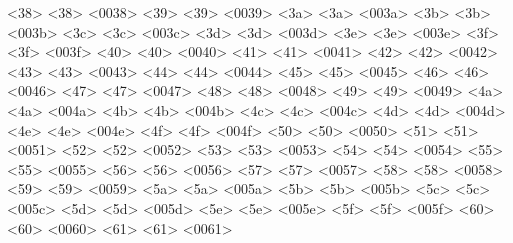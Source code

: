       <38> <38> <0038> %
      <39> <39> <0039> %
      <3a> <3a> <003a> %
      <3b> <3b> <003b> %
      <3c> <3c> <003c> %
      <3d> <3d> <003d> %
      <3e> <3e> <003e> %
      <3f> <3f> <003f> %
      <40> <40> <0040> %
      <41> <41> <0041> %
      <42> <42> <0042> %
      <43> <43> <0043> %
      <44> <44> <0044> %
      <45> <45> <0045> %
      <46> <46> <0046> %
      <47> <47> <0047> %
      <48> <48> <0048> %
      <49> <49> <0049> %
      <4a> <4a> <004a> %
      <4b> <4b> <004b> %
      <4c> <4c> <004c> %
      <4d> <4d> <004d> %
      <4e> <4e> <004e> %
      <4f> <4f> <004f> %
      <50> <50> <0050> %
      <51> <51> <0051> %
      <52> <52> <0052> %
      <53> <53> <0053> %
      <54> <54> <0054> %
      <55> <55> <0055> %
      <56> <56> <0056> %
      <57> <57> <0057> %
      <58> <58> <0058> %
      <59> <59> <0059> %
      <5a> <5a> <005a> %
      <5b> <5b> <005b> %
      <5c> <5c> <005c> %
      <5d> <5d> <005d> %
      <5e> <5e> <005e> %
      <5f> <5f> <005f> %
      <60> <60> <0060> %
      <61> <61> <0061> %

